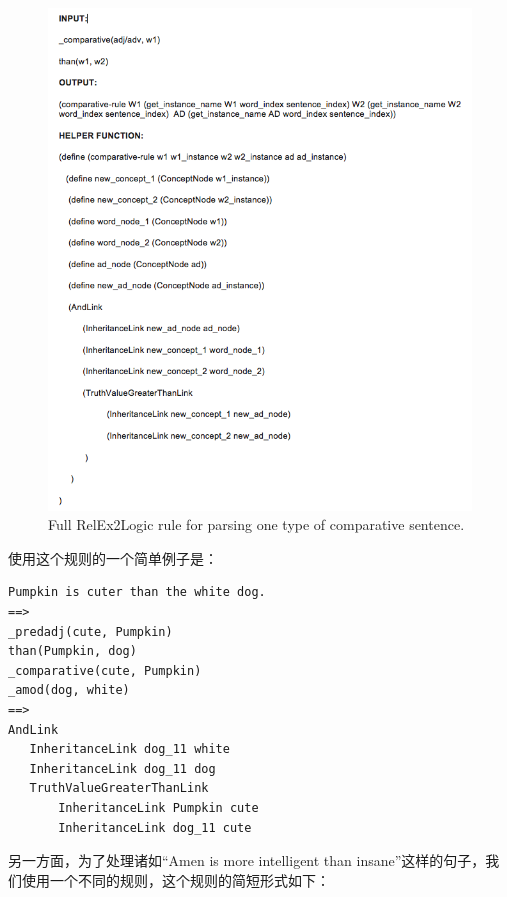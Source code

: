 \begin{figure}
\begin{centering}
\includegraphics[width=15cm]{figures/comparativeRule.png}
\protect\caption{\label{fig:comparativeRule}Full RelEx2Logic rule for parsing one type of comparative sentence.}
\end{centering}
\end{figure}

使用这个规则的一个简单例子是：

{\tt\begin{small}\begin{lstlisting}
Pumpkin is cuter than the white dog.
==>
_predadj(cute, Pumpkin)
than(Pumpkin, dog)
_comparative(cute, Pumpkin)
_amod(dog, white)
==>
AndLink
   InheritanceLink dog_11 white
   InheritanceLink dog_11 dog
   TruthValueGreaterThanLink
       InheritanceLink Pumpkin cute
       InheritanceLink dog_11 cute
\end{lstlisting}\end{small}}

另一方面，为了处理诸如“Amen is more intelligent than insane”这样的句子，我们使用一个不同的规则，这个规则的简短形式如下：

